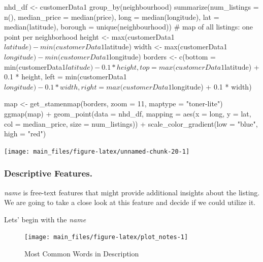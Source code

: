 \begin{Schunk}
\begin{Sinput}
nhd_df <- customerData1 %
    group_by(neighbourhood) %
    summarize(num_listings = n(),
              median_price = median(price),
              long = median(longitude),
              lat = median(latitude),
              borough = unique(neighbourhood))
# map of all listings: one point per neighborhood
height <- max(customerData1$latitude) - min(customerData1$latitude)
width <- max(customerData1$longitude) - min(customerData1$longitude)
borders <- c(bottom  = min(customerData1$latitude)  - 0.1 * height,
             top     = max(customerData1$latitude)  + 0.1 * height,
             left    = min(customerData1$longitude) - 0.1 * width,
             right   = max(customerData1$longitude) + 0.1 * width)

map <- get_stamenmap(borders, zoom = 11, maptype = "toner-lite")
ggmap(map) +
    geom_point(data = nhd_df, mapping = aes(x = long, y = lat,
                                            col = median_price, size = num_listings)) +
    scale_color_gradient(low = "blue", high = "red")
\end{Sinput}


\begin{center}\texttt{[image: main\_files/figure-latex/unnamed-chunk-20-1]} \end{center}

\end{Schunk}

\hypertarget{descriptive-features.}{%
\subsubsection{Descriptive Features.}\label{descriptive-features.}}

\emph{name } is free-text features that might provide additional
insights about the listing. We are going to take a close look at this
feature and decide if we could utilize it.

Lets' begin with the \emph{name}

\begin{Schunk}
\begin{figure}[H]

{\centering \texttt{[image: main\_files/figure-latex/plot\_notes-1]} 

}

\caption[Most Common Words in Description]{Most Common Words in Description}\label{fig:plot_notes}
\end{figure}
\end{Schunk}

